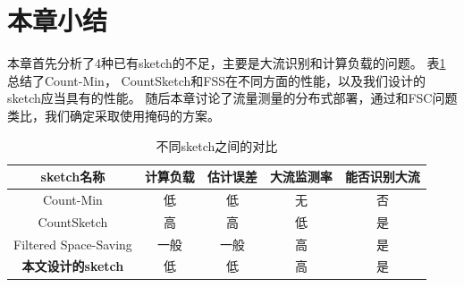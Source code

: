 
\section{本章小结}


本章首先分析了4种已有sketch的不足，主要是大流识别和计算负载的问题。
表\ref{tbl:sketchcompare}总结了Count-Min， CountSketch和FSS在不同方面的性能，以及我们设计的sketch应当具有的性能。
随后本章讨论了流量测量的分布式部署，通过和FSC问题类比，我们确定采取使用掩码的方案。


\begin{table}[ht]
	\centering
	\caption{不同sketch之间的对比}\label{tbl:sketchcompare}
	\begin{tabular}{c|c|c|c|c}
		\hline
		sketch名称 & 计算负载 &估计误差&大流监测率& 能否识别大流 \\
		\hline
		Count-Min\cite{cormode2004improved} & 低 &低& 无 &否\\
		\hline
		CountSketch\cite{charikar2004finding} & 高 &高 &低&是\\
		\hline
		Filtered Space-Saving\cite{homem2010finding}  & 一般 & 一般&高& 是\\
		\hline
		\textbf{本文设计的sketch} & 低 &低 &高&是\\
		\hline		
	\end{tabular}
\end{table}

